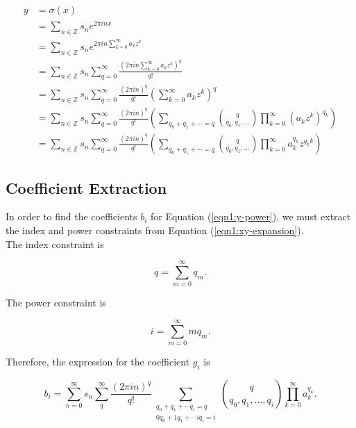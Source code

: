 \documentclass{article}
\begin{document}
    \begin{align}
        y &= \sigma(x) \nonumber \\
          &= \sum_{n\in\mathbb{Z}} s_n e^{2\pi inx} \nonumber \\
          &= \sum_{n\in\mathbb{Z}} s_n e^{2\pi in\sum_{k=0}^{\infty} a_k z^k} \nonumber \\
          &= \sum_{n\in\mathbb{Z}} s_n \sum_{q=0}^{\infty} \frac{\left(2\pi in\sum_{k=0}^{\infty} a_k z^k\right)^q}{q!} \nonumber \\
          &= \sum_{n\in\mathbb{Z}} s_n \sum_{q=0}^{\infty} \frac{(2\pi in)^q}{q!} \left(\sum_{k=0}^{\infty}a_k z^k\right)^q \nonumber \\
          &= \sum_{n\in\mathbb{Z}} s_n \sum_{q=0}^{\infty} \frac{(2\pi in)^q}{q!} \left(\sum_{q_0 + q_1 + \cdots = q} \binom{q}{q_0, q_1, \ldots} \prod_{k=0}^{\infty} \left(a_k z^k\right)^{q_k} \right) \nonumber \\
          &= \sum_{n\in\mathbb{Z}} s_n \sum_{q=0}^{\infty} \frac{(2\pi in)^q}{q!} \left(\sum_{q_0 + q_1 + \cdots = q} \binom{q}{q_0, q_1, \ldots} \prod_{k=0}^{\infty} a_k^{q_k} z^{q_k k} \right)
          \label{eqn1:xy-expansion}
    \end{align}
    
    \subsection{Coefficient Extraction}
    
    In order to find the coefficients $b_i$ for Equation (\ref{eqn1:y-power}), we must extract the index and power constraints from Equation (\ref{eqn1:xy-expansion}).\\
    
    The index constraint is
    
    \begin{equation}
        q = \sum_{m=0}^{\infty} q_m.
    \end{equation}
    
    The power constraint is
    
    \begin{equation}
        i = \sum_{m=0}^{\infty} m q_m.
    \end{equation}
    
    Therefore, the expression for the coefficient $g_i$ is
    
    \begin{equation}
        b_i = \sum_{n=0}^{\infty} s_n \sum_{q}^{\infty} \frac{(2\pi in)^q}{q!} \sum_{\substack{q_0 + q_1 + \cdots q_i = q \\ 0q_0 + 1q_1 + \cdots iq_i = i}} \binom{q}{q_0, q_1, \ldots, q_i} \prod_{k=0}^{\infty} a_k^{q_k}.
        \label{eqn1:icoeff}
    \end{equation}
\end{document}
